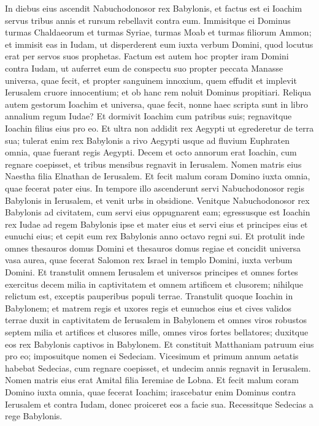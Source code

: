 \begin{biblechapter}  
\verse In diebus eius ascendit Nabuchodonosor rex Babylonis, et factus est ei Ioachim servus tribus annis et rursum rebellavit contra eum. 
\verse Immisitque ei Dominus turmas Chaldaeorum et turmas Syriae, turmas Moab et turmas filiorum Ammon; et immisit eas in Iudam, ut disperderent eum iuxta verbum Domini, quod locutus erat per servos suos prophetas. 
\verse Factum est autem hoc propter iram Domini contra Iudam, ut auferret eum de conspectu suo propter peccata Manasse universa, quae fecit, 
\verse et propter sanguinem innoxium, quem effudit et implevit Ierusalem cruore innocentium; et ob hanc rem noluit Dominus propitiari. 
\verse Reliqua autem gestorum Ioachim et universa, quae fecit, nonne haec scripta sunt in libro annalium regum Iudae? Et dormivit Ioachim cum patribus suis; 
\verse regnavitque Ioachin filius eius pro eo. 
\verse Et ultra non addidit rex Aegypti ut egrederetur de terra sua; tulerat enim rex Babylonis a rivo Aegypti usque ad fluvium Euphraten omnia, quae fuerant regis Aegypti. 
\verse Decem et octo annorum erat Ioachin, cum regnare coepisset, et tribus mensibus regnavit in Ierusalem. Nomen matris eius Naestha filia Elnathan de Ierusalem.  
\verse Et fecit malum coram Domino iuxta omnia, quae fecerat pater eius. 
\verse In tempore illo ascenderunt servi Nabuchodonosor regis Babylonis in Ierusalem, et venit urbs in obsidione. 
\verse Venitque Nabuchodonosor rex Babylonis ad civitatem, cum servi eius oppugnarent eam; 
\verse egressusque est Ioachin rex Iudae ad regem Babylonis ipse et mater eius et servi eius et principes eius et eunuchi eius; et cepit eum rex Babylonis anno octavo regni sui. 
\verse Et protulit inde omnes thesauros domus Domini et thesauros domus regiae et concidit universa vasa aurea, quae fecerat Salomon rex Israel in templo Domini, iuxta verbum Domini. 
\verse Et transtulit omnem Ierusalem et universos principes et omnes fortes exercitus decem milia in captivitatem et omnem artificem et clusorem; nihilque relictum est, exceptis pauperibus populi terrae. 
\verse Transtulit quoque Ioachin in Babylonem; et matrem regis et uxores regis et eunuchos eius et cives validos terrae duxit in captivitatem de Ierusalem in Babylonem 
\verse et omnes viros robustos septem milia et artifices et clusores mille, omnes viros fortes bellatores; duxitque eos rex Babylonis captivos in Babylonem. 
\verse Et constituit Matthaniam patruum eius pro eo; imposuitque nomen ei Sedeciam. 
\verse Vicesimum et primum annum aetatis habebat Sedecias, cum regnare coepisset, et undecim annis regnavit in Ierusalem. Nomen matris eius erat Amital filia Ieremiae de Lobna. 
\verse Et fecit malum coram Domino iuxta omnia, quae fecerat Ioachim; 
\verse irascebatur enim Dominus contra Ierusalem et contra Iudam, donec proiceret eos a facie sua. Recessitque Sedecias a rege Babylonis. 
\end{biblechapter}

